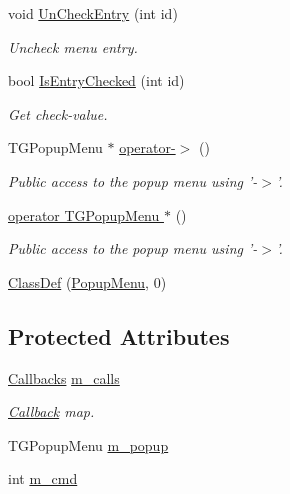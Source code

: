 \begin{DoxyCompactItemize}
void \hyperlink{class_d_d4hep_1_1_popup_menu_aca647cd86c210af4bf0f4e48f487a341}{UnCheckEntry} (int id)
\begin{DoxyCompactList}\small\item\em Uncheck menu entry. \item\end{DoxyCompactList}\item 
bool \hyperlink{class_d_d4hep_1_1_popup_menu_ae1fcd8933b7dbff53327cfb1f13d00d4}{IsEntryChecked} (int id)
\begin{DoxyCompactList}\small\item\em Get check-\/value. \item\end{DoxyCompactList}\item 
TGPopupMenu $\ast$ \hyperlink{class_d_d4hep_1_1_popup_menu_a0241a71021c9288a1f6207a25d6a82e6}{operator-\/$>$} ()
\begin{DoxyCompactList}\small\item\em Public access to the popup menu using '-\/$>$'. \item\end{DoxyCompactList}\item 
\hyperlink{class_d_d4hep_1_1_popup_menu_a979ec84020ea83105d4bfc6c5c5b8fe8}{operator TGPopupMenu $\ast$} ()
\begin{DoxyCompactList}\small\item\em Public access to the popup menu using '-\/$>$'. \item\end{DoxyCompactList}\item 
\hyperlink{class_d_d4hep_1_1_popup_menu_a8ffb8033e698baa49a05c79c66e0f5c2}{ClassDef} (\hyperlink{class_d_d4hep_1_1_popup_menu}{PopupMenu}, 0)
\end{DoxyCompactItemize}
\subsection*{Protected Attributes}
\begin{DoxyCompactItemize}
\item 
\hyperlink{class_d_d4hep_1_1_popup_menu_aea53283ce44fa4935d8b7a3751ad1b5b}{Callbacks} \hyperlink{class_d_d4hep_1_1_popup_menu_a19b33a5d34c5fca703a9e5f6946f5e10}{m\_\-calls}
\begin{DoxyCompactList}\small\item\em \hyperlink{class_d_d4hep_1_1_callback}{Callback} map. \item\end{DoxyCompactList}\item 
TGPopupMenu \hyperlink{class_d_d4hep_1_1_popup_menu_a97937d940ef3c3d519f0ed1a5b8638ee}{m\_\-popup}
\item 
int \hyperlink{class_d_d4hep_1_1_popup_menu_ad631ad62359a2754913630d248967f71}{m\_\-cmd}
\end{DoxyCompactItemize}


